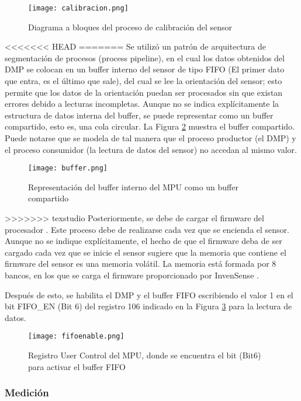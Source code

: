 \begin{figure}[htb]
	\centering
	\texttt{[image: calibracion.png]}
	\caption{Diagrama a bloques del proceso de calibración del sensor}
	\label{fig:calibracion}
\end{figure}

<<<<<<< HEAD
=======
Se utilizó un patrón de arquitectura de segmentación de procesos (process pipeline), en el cual los datos obtenidos del DMP se colocan en un buffer interno del sensor de tipo FIFO (El primer dato que entra, es el último que sale), del cual se lee la orientación del sensor; esto permite que los datos de la orientación puedan ser procesados sin que existan errores debido a lecturas incompletas. Aunque no se indica explícitamente la estructura de datos interna del buffer, se puede representar como un buffer compartido, esto es, una cola circular. La Figura \ref{fig:buffer} muestra el buffer compartido. Puede notarse que se modela de tal manera que el proceso productor (el DMP) y el proceso consumidor (la lectura de datos del sensor) no accedan al mismo valor.

\begin{figure}[htb]
	\centering
	\texttt{[image: buffer.png]}
	\caption{Representación del buffer interno del MPU como un buffer compartido}
	\label{fig:buffer}
\end{figure}

\newpage
>>>>>>> texstudio
Posteriormente, se debe de cargar el firmware del procesador \cite{userguideMotionDriver}. Este proceso debe de realizarse cada vez que se encienda el sensor. Aunque no se indique explícitamente, el hecho de que el firmware deba de ser cargado cada vez que se inicie el sensor sugiere que la memoria que contiene el firmware del sensor es una memoria volátil. La memoria está formada por 8 bancos, en los que se carga el firmware proporcionado por InvenSense \cite{userguideMotionDriver}. 

Después de esto, se habilita el DMP y el buffer FIFO escribiendo el valor 1 en el bit FIFO\_EN (Bit 6) del registro 106 indicado en la Figura \ref{fig:fifoen} para la lectura de datos.

\begin{figure}[htb]
	\centering
	\texttt{[image: fifoenable.png]}
	\caption{Registro User Control del MPU, donde se encuentra el bit (Bit6) para activar el buffer FIFO}
	\label{fig:fifoen}
\end{figure}

\subsubsection{Medición}

